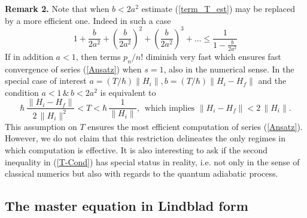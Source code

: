 \documentclass[11 pt]{article}
\begin{document}
\noindent
\textbf{Remark 2.} Note that when $b < 2a^2$ estimate (\ref{term_T_est}) may be replaced by a more efficient one. Indeed in such a case
\[
1 + \frac{b}{2a^2} + \left(\frac{b}{2a^2}\right)^2  + \left(\frac{b}{2a^2}\right)^3 +\ldots  \leq \frac{1}{1-\frac{b}{2a^2}}
\]
If in addition $a<1$, then terms $p_n/n!$ diminish very fast which ensures fast convergence of series (\ref{Ansatz}) when $s=1$, also in the numerical sense. In the special case of interest $a  = (T/\hbar)\|H_i\|, b =  (T/\hbar)\|H_i-H_f\|$ and the condition $a<1\,\& \, b< 2a^2$ is equivalent to
\begin{equation}\label{T-Cond}
\hbar \,\frac{\|H_i-H_f\|}{2\,\|H_i\|^2} < T < \hbar\, \frac{1}{\|H_i\|},\, \mbox{ which implies }
\|H_i-H_f\| < 2\,\|H_i\|.
\end{equation}
This assumption on $T$ ensures the most efficient computation of series (\ref{Ansatz}). However, we do not claim that this restriction delineates the only regimes in which computation is effective. It is also interesting to ask if the second inequality in (\ref{T-Cond}) has special status in reality, i.e. not only in the sense of classical numerics but also with regards to the quantum adiabatic process.


 \subsection{The master equation in Lindblad form}\label{master_subsection}
\end{document}
